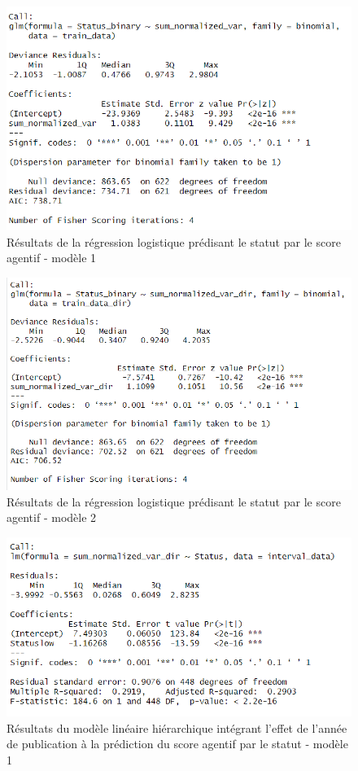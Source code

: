 \begin{figure}[!ht]
    \centering
    \includegraphics[width=12cm]{img/logit_statut.png}
    \caption{Résultats de la régression logistique prédisant le statut par le score agentif - modèle 1}
    \label{logit_statut}
\end{figure}

\begin{figure}[!ht]
    \centering
    \includegraphics[width=12cm]{img/logit_statut_dir.png}
    \caption{Résultats de la régression logistique prédisant le statut par le score agentif - modèle 2}
    \label{logit_statut_dir}
\end{figure}

\begin{figure}[!ht]
    \centering
    \includegraphics[width=12cm]{img/lmer1.png}
    \caption{Résultats du modèle linéaire hiérarchique intégrant l'effet de l'année de publication à la prédiction du score agentif par le statut - modèle 1}
    \label{lmer1}
\end{figure}

